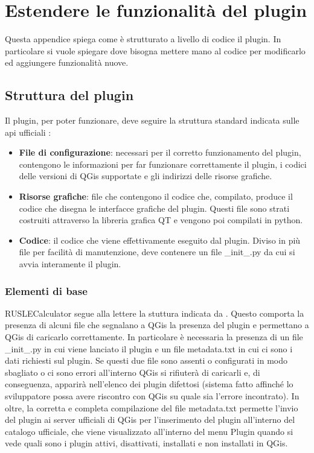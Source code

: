 

\chapter{Estendere le funzionalità del plugin}
\label{cap:appendice}
Questa appendice spiega come è strutturato a livello di codice il plugin. In particolare si vuole spiegare dove bisogna mettere mano al codice per modificarlo ed aggiungere funzionalità nuove.

\section{Struttura del plugin}
Il plugin, per poter funzionare, deve seguire la struttura standard indicata sulle api ufficiali \cite{site:qgisapi}:
\begin{itemize}
	\item \textbf{File di configurazione}: necessari per il corretto funzionamento del plugin, contengono le informazioni per far funzionare correttamente il plugin, i codici delle versioni di QGis supportate e gli indirizzi delle risorse grafiche.
	\item \textbf{Risorse grafiche}: file che contengono il codice che, compilato, produce il codice che disegna le interfacce grafiche del plugin. Questi file sono strati costruiti attraverso la libreria grafica QT e vengono poi compilati in python.
	\item \textbf{Codice}: il codice che viene effettivamente eseguito dal plugin. Diviso in più file per facilità di manutenzione, deve contenere un file \_init\_.py da cui si avvia interamente il plugin.
\end{itemize}

\subsection{Elementi di base}
RUSLECalculator segue alla lettere la stuttura indicata da \cite{site:qgisapi}. Questo comporta la presenza di alcuni file che segnalano a QGis la presenza del plugin e permettano a QGis di caricarlo correttamente.
In particolare è necessaria la presenza di un file \_init\_.py in cui viene lanciato il plugin e un file metadata.txt in cui ci sono i dati richiesti sul plugin. Se questi due file sono assenti o configurati in modo sbagliato o ci sono errori all'interno QGis si rifiuterà di caricarli e, di conseguenza, apparirà nell'elenco dei plugin difettosi (sistema fatto affinché lo sviluppatore possa avere riscontro con QGis su quale sia l'errore incontrato).
In oltre, la corretta e completa compilazione del file metadata.txt permette l'invio del plugin ai server ufficiali di QGis per l'inserimento del plugin all'interno del catalogo ufficiale, che viene visualizzato all'interno del menu Plugin quando si vede quali sono i plugin attivi, disattivati, installati e non installati in QGis.

